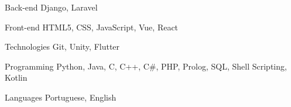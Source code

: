 
\begin{cvskills}
	\cvskill
		{Back-end}
		{Django, Laravel}

	\cvskill
		{Front-end} 
		{HTML5, CSS, JavaScript, Vue, React} 
		
	\cvskill
		{Technologies}
		{Git, Unity, Flutter}

	\cvskill
		{Programming}
		{Python, Java, C, C++, C#, PHP, Prolog, SQL, Shell Scripting, Kotlin} 

	\cvskill
		{Languages}
		{Portuguese, English} 
\end{cvskills}
